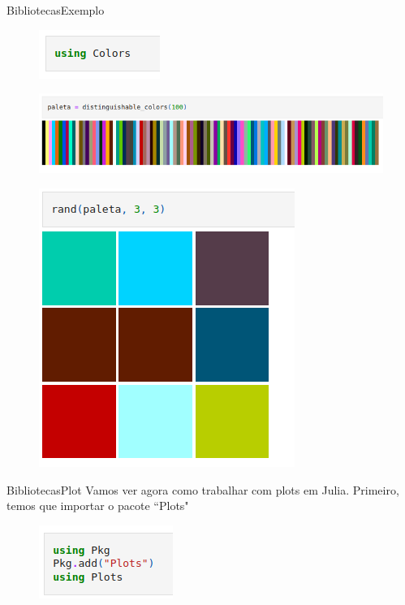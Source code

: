 \documentclass{beamer}
\begin{document}
\begin{frame}{Bibliotecas}{Exemplo}
    \begin{figure}
        \centering
        \includegraphics[scale=0.34]{imagens/colors-02.png}
        \label{fig:my_label}
    \end{figure}
    \begin{figure}
        \centering
        \includegraphics[scale=0.3]{imagens/colors-03.png}
        \label{fig:my_label}
    \end{figure}
    \begin{figure}
        \centering
        \includegraphics[scale=0.3]{imagens/colors04.png}
        \label{fig:my_label}
    \end{figure}
\end{frame}


\begin{frame}{Bibliotecas}{Plot}
    Vamos ver agora como trabalhar com plots em Julia. Primeiro, temos que importar o pacote ``Plots"
    \begin{figure}
        \centering
        \includegraphics[scale=0.5]{imagens/plot.png}
        \label{fig:my_label}
    \end{figure}
\end{frame}
\end{document}
